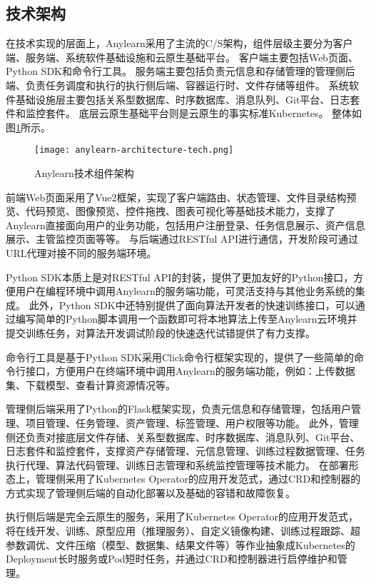 \subsection{技术架构}

在技术实现的层面上，Anylearn采用了主流的C/S架构，组件层级主要分为客户端、服务端、系统软件基础设施和云原生基础平台。
客户端主要包括Web页面、Python SDK和命令行工具。
服务端主要包括负责元信息和存储管理的管理侧后端、负责任务调度和执行的执行侧后端、容器运行时、文件存储等组件。
系统软件基础设施层主要包括关系型数据库、时序数据库、消息队列、Git平台、日志套件和监控套件。
底层云原生基础平台则是云原生的事实标准Kubernetes。
整体如图\ref{fig:anylearntech}所示。

\begin{figure}
  \centering
  \texttt{[image: anylearn-architecture-tech.png]}
  \caption{Anylearn技术组件架构}
  \label{fig:anylearntech}
\end{figure}

前端Web页面采用了Vue2框架，实现了客户端路由、状态管理、文件目录结构预览、代码预览、图像预览、控件拖拽、图表可视化等基础技术能力，支撑了Anylearn直接面向用户的业务功能，包括用户注册登录、任务信息展示、资产信息展示、主管监控页面等等。
与后端通过RESTful API进行通信，开发阶段可通过URL代理对接不同的服务端环境。

Python SDK本质上是对RESTful API的封装，提供了更加友好的Python接口，方便用户在编程环境中调用Anylearn的服务端功能，可灵活支持与其他业务系统的集成。
此外，Python SDK中还特别提供了面向算法开发者的快速训练接口，可以通过编写简单的Python脚本调用一个函数即可将本地算法上传至Anylearn云环境并提交训练任务，对算法开发调试阶段的快速迭代试错提供了有力支撑。

命令行工具是基于Python SDK采用Click命令行框架实现的，提供了一些简单的命令行接口，方便用户在终端环境中调用Anylearn的服务端功能，例如：上传数据集、下载模型、查看计算资源情况等。

管理侧后端采用了Python的Flask框架实现，负责元信息和存储管理，包括用户管理、项目管理、任务管理、资产管理、标签管理、用户权限等功能。
此外，管理侧还负责对接底层文件存储、关系型数据库、时序数据库、消息队列、Git平台、日志套件和监控套件，支撑资产存储管理、元信息管理、训练过程数据管理、任务执行代理、算法代码管理、训练日志管理和系统监控管理等技术能力。
在部署形态上，管理侧采用了Kubernetes Operator的应用开发范式，通过CRD和控制器的方式实现了管理侧后端的自动化部署以及基础的容错和故障恢复。

执行侧后端是完全云原生的服务，采用了Kubernetes Operator的应用开发范式，将在线开发、训练、原型应用（推理服务）、自定义镜像构建、训练过程跟踪、超参数调优、文件压缩（模型、数据集、结果文件等）等作业抽象成Kubernetes的Deployment长时服务或Pod短时任务，并通过CRD和控制器进行启停维护和管理。

